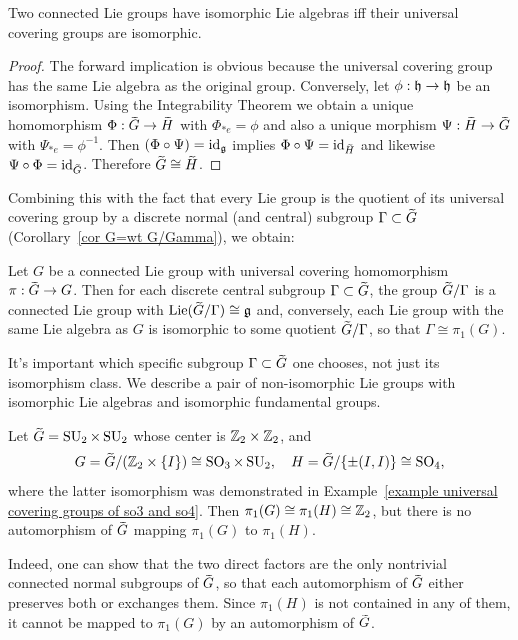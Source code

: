 \begin{thm}[{{\cite[Thm.~9.5.13]{HN}}}]
    Two connected Lie groups have isomorphic Lie algebras iff their universal covering groups are isomorphic.
\end{thm}
\begin{proof}
    The forward implication is obvious because the universal covering group has the same Lie algebra as the original group. Conversely, let $\phi:\mathfrak{h}\to \mathfrak{h}$ be an isomorphism. Using the Integrability Theorem we obtain a unique homomorphism $\Phi:\wt{G}\to \wt{H}$ with $\Phi_{\ast e}=\phi$ and also a unique morphism $\Psi:\wt{H}\to \wt{G}$ with $\Psi_{\ast e}=\phi^{-1}$. Then $(\Phi\circ\Psi)=\operatorname{id}_{\mathfrak{g}}$ implies  $\Phi\circ\Psi=\id_{\wt H}$ and likewise $\Psi\circ\Phi=\id_{\wt G}$. Therefore $\wt{G}\cong \wt{H}$.
\end{proof}
Combining this with the fact that every Lie group is the quotient of its universal covering group by a discrete normal (and central) subgroup $\Gamma\subset \wt{G}$ (Corollary~\ref{cor G=wt G/Gamma}), we obtain:

\begin{cor}
    Let $G$ be a connected Lie group with universal covering homomorphism $\pi:\wt{G}\to G$. Then for each discrete central subgroup $\Gamma\subset \wt G$, the group $\wt{G}\slash\Gamma$ is a connected Lie group with $\Lief (\wt{G}\slash \Gamma)\cong \frakg$  and, conversely, each Lie group with the same Lie algebra as $G$ is isomorphic to some quotient $\wt{G}\slash \Gamma$, so that $\Gamma\cong \pi_1(G)$.
\end{cor}

\begin{example}
    It's important which specific subgroup $\Gamma\subset \wt{G}$ one chooses, not just its isomorphism class.
    We describe a pair of non-isomorphic Lie groups with isomorphic Lie algebras and isomorphic fundamental groups.

    Let $\wt{G}=\SU_2\times \SU_2$ whose center is $\mathbb{Z}_2\times\mathbb{Z}_2$, and 
    \[G=\wt{G}\slash (\bbZ_2\times \{I\})\cong \SO_3\times \SU_2,\quad H=\wt{G}\slash \{\pm (I,I)\}\cong \SO_4,\]
    where the latter isomorphism was demonstrated in Example~\ref{example universal covering groups of so3 and so4}. Then $\pi_1(G)\cong \pi_1(H)\cong \mathbb{Z}_2$, but there is no automorphism of $\wt{G}$ mapping $\pi_1(G)$ to $\pi_1(H)$.

    Indeed, one can show that the two direct factors are the only nontrivial connected normal subgroups of $\wt{G}$, so that each automorphism of $\wt{G}$ either preserves both or exchanges them. Since $\pi_1(H)$ is not contained in any of them, it cannot be mapped to $\pi_1(G)$ by an automorphism of $\wt G$.
\end{example}


